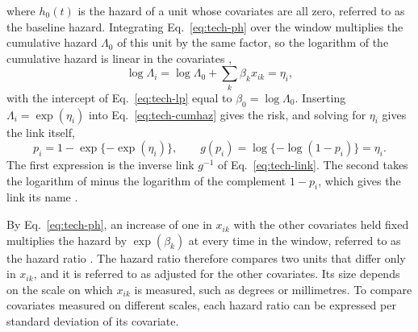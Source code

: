 where $h_0(t)$ is the hazard of a unit whose covariates are all zero, referred to as the baseline hazard.
Integrating Eq.~\eqref{eq:tech-ph} over the window multiplies the cumulative hazard $\Lambda_0$ of this unit by the same factor, so the logarithm of the cumulative hazard is linear in the covariates \cite[Section~10.2.2]{dobson2002glm},
\begin{equation}
  \log\Lambda_i = \log\Lambda_0 + \sum_k \beta_k x_{ik} = \eta_i ,
  \label{eq:tech-logcumhaz}
\end{equation}
with the intercept of Eq.~\eqref{eq:tech-lp} equal to $\beta_0 = \log\Lambda_0$.
Inserting $\Lambda_i = \exp(\eta_i)$ into Eq.~\eqref{eq:tech-cumhaz} gives the risk, and solving for $\eta_i$ gives the link itself,
\begin{equation}
  p_i = 1 - \exp\{-\exp(\eta_i)\},
  \qquad
  g(p_i) = \log\{-\log(1 - p_i)\} = \eta_i .
  \label{eq:tech-cloglog}
\end{equation}
The first expression is the inverse link $g^{-1}$ of Eq.~\eqref{eq:tech-link}.
The second takes the logarithm of minus the logarithm of the complement $1 - p_i$, which gives the link its name \cite[Section~7.3]{dobson2002glm}.

By Eq.~\eqref{eq:tech-ph}, an increase of one in $x_{ik}$ with the other covariates held fixed multiplies the hazard by $\exp(\beta_k)$ at every time in the window, referred to as the hazard ratio \cite[Section~10.2.2, Eq.~10.7]{dobson2002glm}.
The hazard ratio therefore compares two units that differ only in $x_{ik}$, and it is referred to as adjusted for the other covariates.
Its size depends on the scale on which $x_{ik}$ is measured, such as degrees or millimetres.
To compare covariates measured on different scales, each hazard ratio can be expressed per standard deviation of its covariate.

